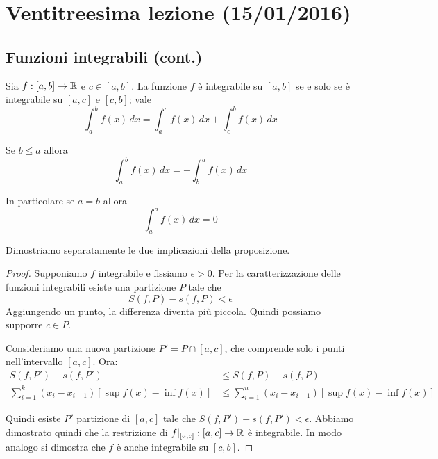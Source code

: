 \chapter{Ventitreesima lezione (15/01/2016)}

\section{Funzioni integrabili (cont.)}

\begin{proposition}
Sia $f:[a,b] \to \mathbb R$ e $c \in [a,b]$. La funzione $f$ è integrabile su $[a,b]$ se e solo se è integrabile su $[a,c]$ e $[c,b]$; vale
\begin{equation*}
\int_a^b f(x) \, dx = \int_a^c f(x) \, dx + \int_c^b f(x) \, dx
\end{equation*}
\end{proposition}

\begin{definition}
Se $b \le a$ allora
\begin{equation*}
\int_a^b f(x) \, dx = - \int_b^a f(x) \, dx
\end{equation*}

In particolare se $a = b$ allora
\begin{equation*}
\int_a^a f(x) \, dx = 0
\end{equation*}
\end{definition}

Dimostriamo separatamente le due implicazioni della proposizione.

\begin{proof}
Supponiamo $f$ integrabile e fissiamo $\epsilon > 0$. Per la caratterizzazione delle funzioni integrabili esiste una partizione $P$ tale che 
\begin{equation*}
S(f,P) - s(f,P) < \epsilon
\end{equation*}
Aggiungendo un punto, la differenza diventa più piccola. Quindi possiamo supporre $c \in P$.

Consideriamo una nuova partizione $P' = P \cap [a,c]$, che comprende solo i punti nell'intervallo $[a,c]$. Ora:
\begin{align*}
S(f,P')-s(f,P') &\le S(f,P)-s(f,P) \\
\sum_{i=1}^k (x_i-x_{i-1})[\sup f(x) - \inf f(x)] &\le \sum_{i=1}^n (x_i-x_{i-1})[\sup f(x) - \inf f(x)]
\end{align*}

Quindi esiste $P'$ partizione di $[a,c]$ tale che $S(f,P')-s(f,P')<\epsilon$. Abbiamo dimostrato quindi che la restrizione di $f|_{[a,c]} : [a,c] \to \mathbb R$ è integrabile. In modo analogo si dimostra che $f$ è anche integrabile su $[c,b]$.
\end{proof}

